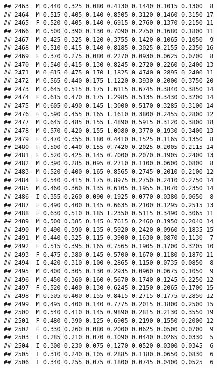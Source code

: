 \documentclass[
]{article}
\begin{document}
\begin{verbatim}
## 2463  M 0.440 0.325 0.080 0.4130 0.1440 0.1015 0.1300  8
## 2464  M 0.515 0.405 0.140 0.8505 0.3120 0.1460 0.3150 17
## 2465  F 0.520 0.405 0.140 0.6915 0.2760 0.1370 0.2150 11
## 2466  M 0.500 0.390 0.130 0.7090 0.2750 0.1680 0.1800 11
## 2467  M 0.425 0.325 0.120 0.3755 0.1420 0.1065 0.1050  9
## 2468  M 0.510 0.415 0.140 0.8185 0.3025 0.2155 0.2350 16
## 2469  F 0.370 0.275 0.080 0.2270 0.0930 0.0625 0.0700  8
## 2470  M 0.540 0.415 0.130 0.8245 0.2720 0.2260 0.2400 13
## 2471  M 0.615 0.475 0.170 1.1825 0.4740 0.2895 0.2400 11
## 2472  M 0.565 0.440 0.175 1.1220 0.3930 0.2000 0.3750 20
## 2473  M 0.645 0.515 0.175 1.6115 0.6745 0.3840 0.3850 14
## 2474  F 0.615 0.470 0.175 1.2985 0.5135 0.3430 0.3200 14
## 2475  M 0.605 0.490 0.145 1.3000 0.5170 0.3285 0.3100 14
## 2476  F 0.590 0.455 0.165 1.1610 0.3800 0.2455 0.2800 12
## 2477  M 0.645 0.485 0.155 1.4890 0.5915 0.3120 0.3800 18
## 2478  M 0.570 0.420 0.155 1.0080 0.3770 0.1930 0.3400 13
## 2479  F 0.470 0.355 0.180 0.4410 0.1525 0.1165 0.1350  8
## 2480  F 0.500 0.440 0.155 0.7420 0.2025 0.2005 0.2115 14
## 2481  F 0.520 0.425 0.145 0.7000 0.2070 0.1905 0.2400 13
## 2482  M 0.390 0.285 0.095 0.2710 0.1100 0.0600 0.0800  8
## 2483  M 0.520 0.400 0.165 0.8565 0.2745 0.2010 0.2100 12
## 2484  F 0.540 0.415 0.175 0.8975 0.2750 0.2410 0.2750 14
## 2485  M 0.460 0.360 0.135 0.6105 0.1955 0.1070 0.2350 14
## 2486  I 0.355 0.260 0.090 0.1925 0.0770 0.0380 0.0650  8
## 2487  F 0.490 0.400 0.145 0.6635 0.2100 0.1295 0.2515 13
## 2488  F 0.630 0.510 0.185 1.2350 0.5115 0.3490 0.3065 11
## 2489  M 0.500 0.385 0.145 0.7615 0.2460 0.1950 0.2040 14
## 2490  M 0.490 0.390 0.135 0.5920 0.2420 0.0960 0.1835 15
## 2491  M 0.440 0.325 0.115 0.3900 0.1630 0.0870 0.1130  7
## 2492  F 0.515 0.395 0.165 0.7565 0.1905 0.1700 0.3205 10
## 2493  F 0.475 0.380 0.145 0.5700 0.1670 0.1180 0.1870 11
## 2494  I 0.420 0.310 0.100 0.2865 0.1150 0.0735 0.0850  8
## 2495  M 0.400 0.305 0.130 0.2935 0.0960 0.0675 0.1050  9
## 2496  M 0.450 0.360 0.160 0.5670 0.1740 0.1245 0.2250 12
## 2497  F 0.520 0.400 0.130 0.6245 0.2150 0.2065 0.1700 15
## 2498  M 0.505 0.400 0.155 0.8415 0.2715 0.1775 0.2850 12
## 2499  M 0.495 0.400 0.140 0.7775 0.2015 0.1800 0.2500 15
## 2500  M 0.540 0.410 0.145 0.9890 0.2815 0.2130 0.3550 19
## 2501  F 0.480 0.390 0.125 0.6905 0.2190 0.1550 0.2000 12
## 2502  F 0.330 0.260 0.080 0.2000 0.0625 0.0500 0.0700  9
## 2503  I 0.285 0.210 0.070 0.1090 0.0440 0.0265 0.0330  5
## 2504  I 0.300 0.230 0.075 0.1270 0.0520 0.0300 0.0345  6
## 2505  I 0.310 0.240 0.105 0.2885 0.1180 0.0650 0.0830  6
## 2506  I 0.340 0.255 0.075 0.1800 0.0745 0.0400 0.0525  6

\end{verbatim}
\end{document}
